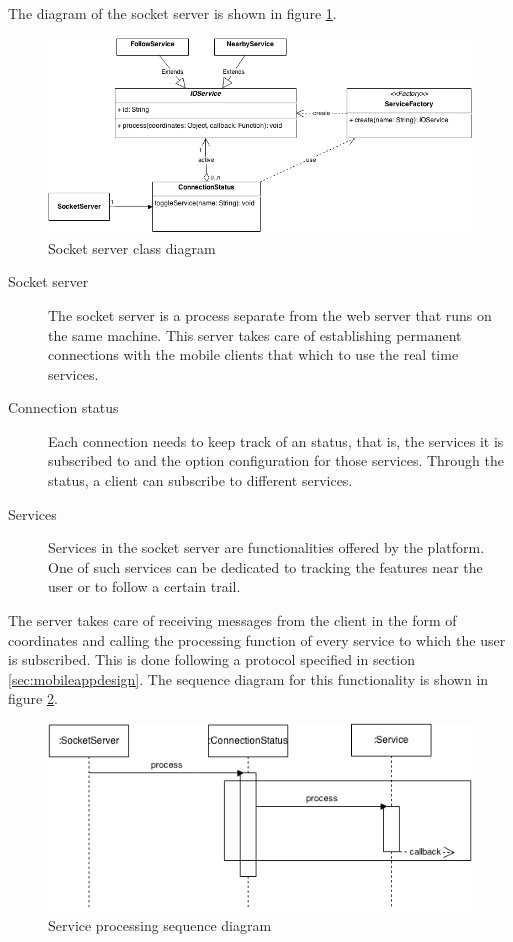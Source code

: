 The diagram of the socket server is shown in figure \ref{fig:socket-component}.

\begin{figure}[ht]
  \centering
  \includegraphics[width=.8\textwidth]{fig/socket-component}
  \caption{Socket server class diagram}
  \label{fig:socket-component}
\end{figure}

\begin{description}
\item[Socket server] The socket server is a process separate from the web server that runs on the same machine. This server takes care of establishing permanent connections with the mobile clients that which to use the real time services.

\item[Connection status] Each connection needs to keep track of an status, that is, the services it is subscribed to and the option configuration for those services. Through the status, a client can subscribe to different services.

\item[Services] Services in the socket server are functionalities offered by the platform. One of such services can be dedicated to tracking the features near the user or to follow a certain trail.
\end{description}

The server takes care of receiving messages from the client in the form of coordinates and calling the processing function of every service to which the user is subscribed. This is done following a protocol specified in section \ref{sec:mobileappdesign}. The sequence diagram for this functionality is shown in figure \ref{fig:socket-flow}.

\begin{figure}[ht]
  \centering
  \includegraphics[width=.8\textwidth]{fig/socket-flow}
  \caption{Service processing sequence diagram}
  \label{fig:socket-flow}
\end{figure}

